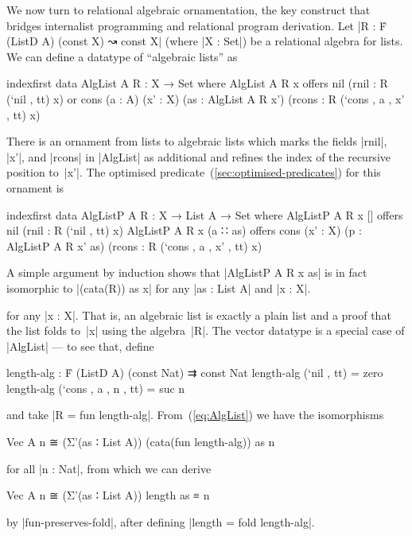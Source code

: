 We now turn to relational algebraic ornamentation, the key construct that bridges internalist programming and relational program derivation.
Let |R : Ḟ (ListD A) (const X) ↝ const X| (where |X : Set|) be a relational algebra for lists.
We can define a datatype of ``algebraic lists'' as
\begin{code}
indexfirst data AlgList A R : X → Set where
  AlgList A R x  offers  nil   (rnil : R (`nil , tt) x)
                 or      cons  (a : A) (x' : X) (as : AlgList A R x')
                               (rcons : R (`cons , a , x' , tt) x)
\end{code}
There is an ornament from lists to algebraic lists which marks the fields |rnil|, |x'|, and |rcons| in |AlgList| as additional and refines the index of the recursive position to~|x'|.
The optimised predicate~(\autoref{sec:optimised-predicates}) for this ornament is
\begin{code}
indexfirst data AlgListP A R : X → List A → Set where
  AlgListP A R x []        offers  nil (rnil : R (`nil , tt) x)
  AlgListP A R x (a ∷ as)  offers  cons  (x' : X)
                                         (p : AlgListP A R x' as)
                                         (rcons : R (`cons , a , x' , tt) x)
\end{code}
A simple argument by induction shows that |AlgListP A R x as| is in fact isomorphic to |(cata(R)) as x| for any |as : List A| and |x : X|.
for any |x : X|.
That is, an algebraic list is exactly a plain list and a proof that the list folds to~|x| using the algebra~|R|.
The vector datatype is a special case of |AlgList| --- to see that, define
\begin{code}
length-alg :  Ḟ (ListD A) (const Nat) ⇉ const Nat
length-alg (`nil   ,          tt)  = zero
length-alg (`cons  , a , n ,  tt)  = suc n
\end{code}
and take |R = fun length-alg|.
From~(\ref{eq:AlgList}) we have the isomorphisms
\begin{code}
Vec A n ≅ (Σ'(as ∶ List A)) (cata(fun length-alg)) as n
\end{code}
for all |n : Nat|, from which we can derive
\begin{code}
Vec A n ≅ (Σ'(as ∶ List A)) length as ≡ n
\end{code}
by |fun-preserves-fold|, after defining |length = fold length-alg|.

